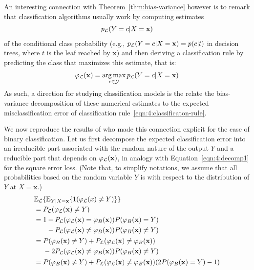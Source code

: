 An interesting connection with Theorem~\ref{thm:bias-variance} however is to
remark that classification algorithms usually work by computing estimates
\begin{equation}
p_{\cal L}(Y=c|X=\mathbf{x})
\end{equation}
of the conditional class probability (e.g.,
$p_{\cal L}(Y=c|X=\mathbf{x}) = p(c|t)$ in decision trees, where $t$ is the
leaf reached by $\mathbf{x}$) and then deriving a classification rule by
predicting the class that maximizes this estimate, that is:
\begin{equation}\label{eqn:4:classificaton-rule}
\varphi_{\cal L}(\mathbf{x}) = \operatorname*{arg\,max}_{c \in {\cal Y}} p_{\cal L}(Y=c|X=\mathbf{x})
\end{equation}
As such, a direction for studying classification models is the relate the
bias-variance decomposition of these numerical estimates to the expected
misclassification error of classification rule~\ref{eqn:4:classificaton-rule}.

We now reproduce the results of \citet{friedman:1997} who made this connection
explicit for the case of binary classification. Let us first decompose the
expected classification error into an irreducible part associated with the
random nature of the output $Y$ and a reducible part that depends on
$\varphi_{\cal L}(\mathbf{x})$, in analogy with Equation~\ref{eqn:4:decomp1}
for the square error loss. (Note that, to simplify notations, we assume that
all probabilities based on the random variable $Y$ is with respect to the
distribution of $Y$ at $X=\mathbf{x}$.)
\begin{align}
& \mathbb{E}_{\cal L}\{ \mathbb{E}_{Y|X=\mathbf{x}} \{ 1(\varphi_{\cal L}(x) \neq Y) \} \}  \\
&= P_{{\cal L}}(\varphi_{\cal L}(\mathbf{x}) \neq Y) \nonumber \\
&= \begin{aligned}[t]
    1 &- P_{\cal L}(\varphi_{\cal L}(\mathbf{x}) = \varphi_B(\mathbf{x})) P(\varphi_B(\mathbf{x})=Y) \nonumber \\
      &- P_{\cal L}(\varphi_{\cal L}(\mathbf{x}) \neq \varphi_B(\mathbf{x})) P(\varphi_B(\mathbf{x})\neq Y) \nonumber
   \end{aligned}\nonumber \\
&= \begin{aligned}[t]
    &P(\varphi_B(\mathbf{x})\neq Y) + P_{\cal L}(\varphi_{\cal L}(\mathbf{x})\neq \varphi_B(\mathbf{x})) \nonumber \\
    &- 2 P_{\cal L}(\varphi_{\cal L}(\mathbf{x})\neq \varphi_B(\mathbf{x})) P(\varphi_B(\mathbf{x})\neq Y)  \nonumber \\
   \end{aligned}\nonumber \\
&= P(\varphi_B(\mathbf{x})\neq Y) + P_{\cal L}(\varphi_{\cal L}(\mathbf{x})\neq \varphi_B(\mathbf{x}))(2 P(\varphi_B(\mathbf{x}) = Y) - 1) \nonumber
\end{align}

